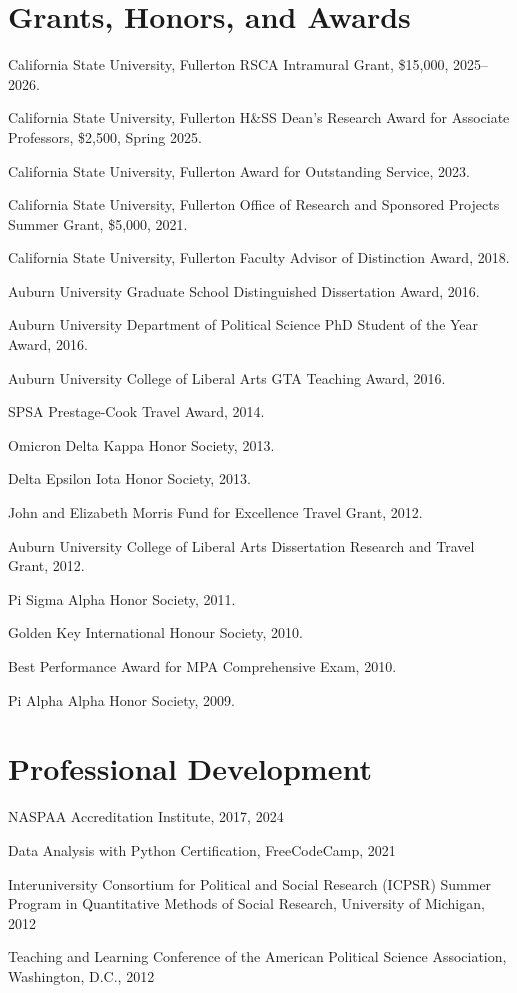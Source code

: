 \documentclass[12pt,letterpaper]{article}
\renewenvironment{itemize}{
  \begin{list}{}{
    \setlength{\leftmargin}{1.5em}
    \setlength{\itemsep}{0.25em}
    \setlength{\parskip}{0pt}
    \setlength{\parsep}{0.25em}
  }
}{
  \end{list}
}
\begin{document}
\section*{Grants, Honors, and Awards}
\begin{itemize}\leftmargin=2pt\itemindent=-15pt
  \item California State University, Fullerton RSCA Intramural Grant, \$15,000, 2025--2026.
  \item California State University, Fullerton H\&SS Dean's Research Award for Associate Professors, \$2,500, Spring 2025.
  \item California State University, Fullerton Award for Outstanding Service, 2023.
  \item California State University, Fullerton Office of Research and Sponsored Projects Summer Grant, \$5,000, 2021.
  \item California State University, Fullerton Faculty Advisor of Distinction Award, 2018.
  \item Auburn University Graduate School Distinguished Dissertation Award, 2016.
  \item Auburn University Department of Political Science PhD Student of the Year Award, 2016.
  \item Auburn University College of Liberal Arts GTA Teaching Award, 2016.
  \item SPSA Prestage-Cook Travel Award, 2014.
  \item Omicron Delta Kappa Honor Society, 2013.
  \item Delta Epsilon Iota Honor Society, 2013.
  \item John and Elizabeth Morris Fund for Excellence Travel Grant, 2012.
  \item Auburn University College of Liberal Arts Dissertation Research and Travel Grant, 2012.
  \item Pi Sigma Alpha Honor Society, 2011.
  \item Golden Key International Honour Society, 2010.
  \item Best Performance Award for MPA Comprehensive Exam, 2010.
  \item Pi Alpha Alpha Honor Society, 2009.
\end{itemize}

\section*{Professional Development}
\begin{itemize}\leftmargin=2pt\itemindent=-15pt
  \item NASPAA Accreditation Institute, 2017, 2024
  \item Data Analysis with Python Certification, FreeCodeCamp, 2021
  \item Interuniversity Consortium for Political and Social Research (ICPSR) Summer Program in Quantitative Methods of Social Research, University of Michigan, 2012
  \item Teaching and Learning Conference of the American Political Science Association, Washington, D.C., 2012
\end{itemize}
\end{document}
